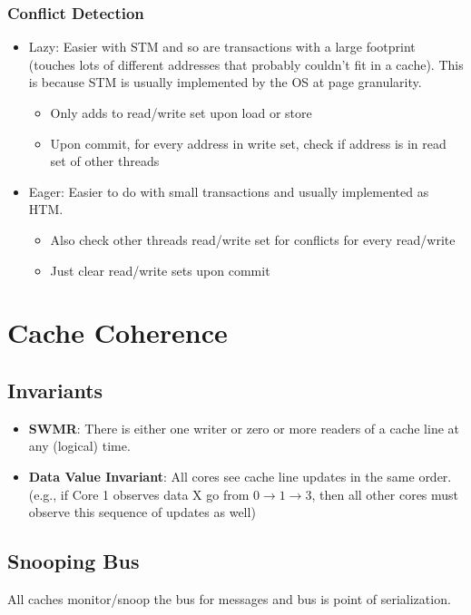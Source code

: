 \documentclass{article}
\begin{document}
\begin{multicols*}{2}
\subsubsection{Conflict Detection}
\begin{itemize}
    \item Lazy:
    Easier with STM and so are transactions with a large footprint (touches lots of different addresses that probably couldn't fit in a cache). This is because STM is usually implemented by the OS at page granularity.
    \begin{itemize}
        \item Only adds to read/write set upon load or store
        \item Upon commit, for every address in write set, check if address is in read set of other threads
    \end{itemize}
    \item Eager:
    Easier to do with small transactions and usually implemented as HTM.
    \begin{itemize}
        \item Also check other threads read/write set for conflicts for every read/write
        \item Just clear read/write sets upon commit
    \end{itemize}
\end{itemize}

\section{Cache Coherence}
\subsection{Invariants}
\begin{itemize}
    \item \textbf{SWMR}: There is either one writer or zero or more readers of a cache line at any (logical) time.
    \item \textbf{Data Value Invariant}: All cores see cache line updates in the same order. (e.g., if Core 1 observes data X go from $0 \rightarrow 1 \rightarrow 3$, then all other cores must observe this sequence of updates as well)
\end{itemize}
\subsection{Snooping Bus}
All caches monitor/snoop the bus for messages and bus is point of serialization. 


\end{multicols*}
\end{document}
